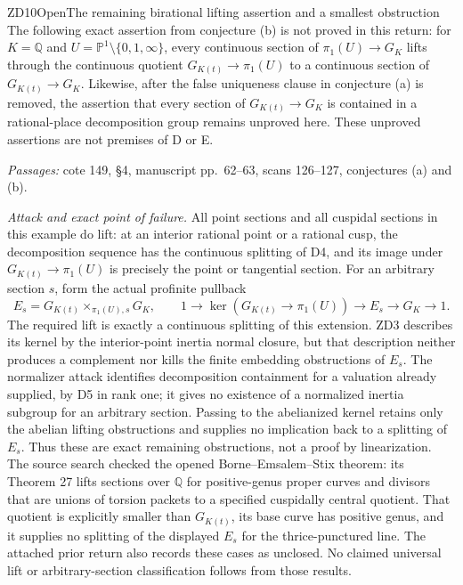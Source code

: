 \begin{result}{ZD10}{Open}{The remaining birational lifting assertion and a smallest obstruction}
The following exact assertion from conjecture (b) is not proved in this return: for $K=\mathbb Q$ and $U=\mathbb P^1\setminus\{0,1,\infty\}$, every continuous section of $\pi_1(U)\to G_K$ lifts through the continuous quotient $G_{K(t)}\to\pi_1(U)$ to a continuous section of $G_{K(t)}\to G_K$. Likewise, after the false uniqueness clause in conjecture (a) is removed, the assertion that every section of $G_{K(t)}\to G_K$ is contained in a rational-place decomposition group remains unproved here. These unproved assertions are not premises of D or E.
\par\emph{Passages:} cote 149, \S4, manuscript pp.~62--63, scans 126--127, conjectures (a) and (b).
\end{result}
\noindent\emph{Attack and exact point of failure.}
All point sections and all cuspidal sections in this example do lift: at an interior rational point or a rational cusp, the decomposition sequence has the continuous splitting of D4, and its image under $G_{K(t)}\to\pi_1(U)$ is precisely the point or tangential section. For an arbitrary section $s$, form the actual profinite pullback
\[
 E_s=G_{K(t)}\times_{\pi_1(U),s}G_K,
 \qquad 1\longrightarrow\ker(G_{K(t)}\to\pi_1(U))\longrightarrow E_s\longrightarrow G_K\longrightarrow1.
\]
The required lift is exactly a continuous splitting of this extension. ZD3 describes its kernel by the interior-point inertia normal closure, but that description neither produces a complement nor kills the finite embedding obstructions of $E_s$. The normalizer attack identifies decomposition containment for a valuation already supplied, by D5 in rank one; it gives no existence of a normalized inertia subgroup for an arbitrary section. Passing to the abelianized kernel retains only the abelian lifting obstructions and supplies no implication back to a splitting of $E_s$. Thus these are exact remaining obstructions, not a proof by linearization. The source search checked the opened Borne--Emsalem--Stix theorem: its Theorem 27 lifts sections over $\mathbb Q$ for positive-genus proper curves and divisors that are unions of torsion packets to a specified cuspidally central quotient. That quotient is explicitly smaller than $G_{K(t)}$, its base curve has positive genus, and it supplies no splitting of the displayed $E_s$ for the thrice-punctured line. The attached prior return also records these cases as unclosed. No claimed universal lift or arbitrary-section classification follows from those results.

